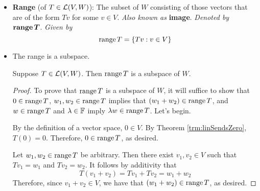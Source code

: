 \documentclass[../main.tex]{subfiles}
\begin{document}
\begin{itemize}
\begin{theorem}
\begin{proof}
            Suppose first that $T$ is injective. To prove that $\nul T=\{0\}$, it will suffice to show that $0\in\nul T$ and for every $v\in\nul T$, $v=0$. By Theorem \ref{trm:nullSpace}, $0\in\nul T$. Now let $v\in\nul T$ be arbitrary. By the definition of the null space, we have $Tv=0$. By Theorem \ref{trm:linSendsZero}, we have $T(0)=0$. Thus, by transitivity, we have that $Tv=T(0)$. It follows by injectivity that $v=0$, as desired.\par
            Now suppose that $\nul T=\{0\}$. To prove that $T$ is injective, it will suffice to show that if $Tu=Tv$, then $u=v$. Suppose $u,v\in V$ satisfy $Tu=Tv$. Then
            \begin{equation*}
                0 = Tu-Tv = T(u-v)
            \end{equation*}
            so $(u-v)\in\nul T=\{0\}$. It follows that $u-v=0$, i.e., that $u=v$, as desired.
        \end{proof}
    \end{theorem}
    \item \textbf{Range} (of $T\in\mathcal{L}(V,W)$): The subset of $W$ consisting of those vectors that are of the form $Tv$ for some $v\in V$. \emph{Also known as} \textbf{image}. \emph{Denoted by} $\bm{\range T}$. \emph{Given by}
    \begin{equation*}
        \operatorname{range} T = \{Tv:v\in V\}
    \end{equation*}
    \item The range is a subspace.
    \begin{theorem}\label{trm:rangeSpace}
        Suppose $T\in\mathcal{L}(V,W)$. Then $\operatorname{range} T$ is a subspace of $W$.
        \begin{proof}
            To prove that $\operatorname{range} T$ is a subspace of $W$, it will suffice to show that $0\in\operatorname{range} T$, $w_1,w_2\in\operatorname{range} T$ implies that $(w_1+w_2)\in\operatorname{range} T$, and $w\in\operatorname{range} T$ and $\lambda\in\mathbb{F}$ imply $\lambda w\in\operatorname{range} T$. Let's begin.\par
            By the definition of a vector space, $0\in V$. By Theorem \ref{trm:linSendsZero}, $T(0)=0$. Therefore, $0\in\operatorname{range} T$, as desired.\par
            Let $w_1,w_2\in\operatorname{range} T$ be arbitrary. Then there exist $v_1,v_2\in V$ such that $Tv_1=w_1$ and $Tv_2=w_2$. It follows by additivity that
            \begin{equation*}
                T(v_1+v_2) = Tv_1+Tv_2 = w_1+w_2
            \end{equation*}
            Therefore, since $v_1+v_2\in V$, we have that $(w_1+w_2)\in\operatorname{range} T$, as desired.\par

\end{proof}
\end{theorem}
\end{itemize}
\end{document}
